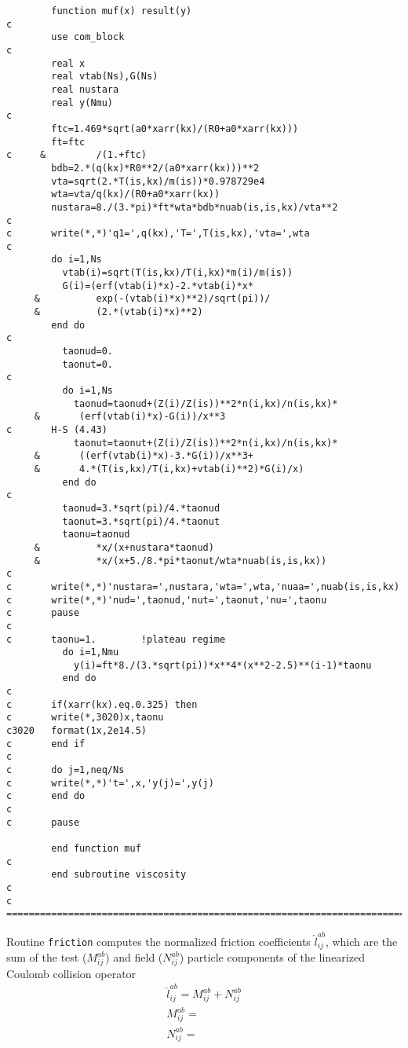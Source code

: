 \begin{verbatim}
        function muf(x) result(y)
c
        use com_block
c
        real x
        real vtab(Ns),G(Ns)
        real nustara
        real y(Nmu)
c
        ftc=1.469*sqrt(a0*xarr(kx)/(R0+a0*xarr(kx)))
        ft=ftc
c     &         /(1.+ftc)
        bdb=2.*(q(kx)*R0**2/(a0*xarr(kx)))**2
        vta=sqrt(2.*T(is,kx)/m(is))*0.978729e4
        wta=vta/q(kx)/(R0+a0*xarr(kx))
        nustara=8./(3.*pi)*ft*wta*bdb*nuab(is,is,kx)/vta**2
c
c       write(*,*)'q1=',q(kx),'T=',T(is,kx),'vta=',wta
c
        do i=1,Ns
          vtab(i)=sqrt(T(is,kx)/T(i,kx)*m(i)/m(is))
          G(i)=(erf(vtab(i)*x)-2.*vtab(i)*x*
     &          exp(-(vtab(i)*x)**2)/sqrt(pi))/
     &          (2.*(vtab(i)*x)**2)
        end do
c
          taonud=0.
          taonut=0.
c
          do i=1,Ns
            taonud=taonud+(Z(i)/Z(is))**2*n(i,kx)/n(is,kx)*
     &       (erf(vtab(i)*x)-G(i))/x**3
c       H-S (4.43)     
            taonut=taonut+(Z(i)/Z(is))**2*n(i,kx)/n(is,kx)*
     &       ((erf(vtab(i)*x)-3.*G(i))/x**3+
     &       4.*(T(is,kx)/T(i,kx)+vtab(i)**2)*G(i)/x)
          end do
c
          taonud=3.*sqrt(pi)/4.*taonud
          taonut=3.*sqrt(pi)/4.*taonut
          taonu=taonud
     &          *x/(x+nustara*taonud)
     &          *x/(x+5./8.*pi*taonut/wta*nuab(is,is,kx))
c
c       write(*,*)'nustara=',nustara,'wta=',wta,'nuaa=',nuab(is,is,kx)
c       write(*,*)'nud=',taonud,'nut=',taonut,'nu=',taonu
c       pause
c
c       taonu=1.        !plateau regime
          do i=1,Nmu
            y(i)=ft*8./(3.*sqrt(pi))*x**4*(x**2-2.5)**(i-1)*taonu
          end do
c
c       if(xarr(kx).eq.0.325) then
c       write(*,3020)x,taonu
c3020   format(1x,2e14.5)
c       end if
c
c       do j=1,neq/Ns
c       write(*,*)'t=',x,'y(j)=',y(j)
c       end do
c
c       pause

        end function muf
c
        end subroutine viscosity
c
c ========================================================================
\end{verbatim}
Routine {\tt friction} computes the normalized friction coefficients $\hat l^{ab}_{ij}$, which are the sum of the test ($M^{ab}_{ij}$) and field ($N^{ab}_{ij}$) particle components of the linearized Coulomb collision operator~\cite{hirshman81} 
\begin{eqnarray}
\hat l^{ab}_{ij} = M^{ab}_{ij} + N^{ab}_{ij} \\
M^{ab}_{ij} = \\
N^{ab}_{ij} =
\label{eq:labij}
\end{eqnarray}
